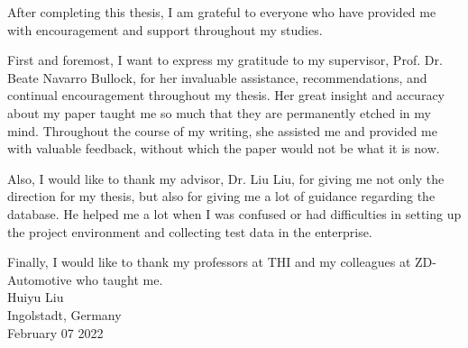 
After completing this thesis, I am grateful to everyone who have provided me with encouragement and support throughout my studies.

First and foremost, I want to express my gratitude to my supervisor, Prof. Dr. Beate Navarro Bullock, for her invaluable assistance, recommendations, and continual encouragement throughout my thesis. Her great insight and accuracy about my paper taught me so much that they are permanently etched in my mind. Throughout the course of my writing, she assisted me and provided me with valuable feedback, without which the paper would not be what it is now.

Also, I would like to thank my advisor, Dr. Liu Liu, for giving me not only the direction for my thesis, but also for giving me a lot of guidance regarding the database. He helped me a lot when I was confused or had difficulties in setting up the project environment and collecting test data in the enterprise.

Finally, I would like to thank my professors at THI and my colleagues at ZD-Automotive who taught me.\\ [1.5cm]


		
Huiyu Liu\\
Ingolstadt, Germany\\
February 07 2022